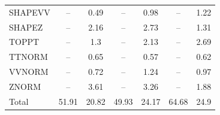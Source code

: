 \begin{table}[H]
\begin{center}
\begin{footnotesize}
\begin{tabular}{lcccccc}
				SHAPEVV & -- &  0.49 & -- &  0.98 & -- &  1.22 \\
				SHAPEZ & -- &  2.16 & -- &  2.73 & -- &  1.31 \\
				TOPPT & -- &  1.3 & -- &  2.13 & -- &  2.69 \\
				TTNORM & -- &  0.65 & -- &  0.57 & -- &  0.62 \\
				VVNORM & -- &  0.72 & -- &  1.24 & -- &  0.97 \\
				ZNORM & -- &  3.61 & -- &  3.26 & -- &  1.88 \\
				Total &  51.91  &  20.82 &  49.93  &  24.17 &  64.68  &  24.9 \\ \hline \hline
			\end{tabular}
			\label{tab:SysUncertainties_2000}
        \end{footnotesize}
	\end{center}
\end{table}



